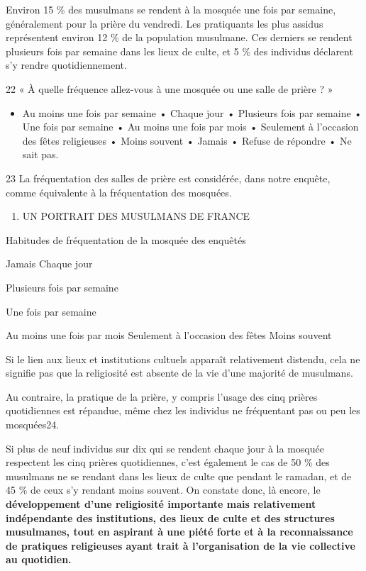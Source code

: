 Environ 15 \% des musulmans se rendent à la mosquée une fois par
semaine, généralement pour la prière du vendredi. Les pratiquants les
plus assidus représentent environ 12 \% de la population musulmane. Ces
derniers se rendent plusieurs fois par semaine dans les lieux de culte,
et 5 \% des individus déclarent s'y rendre quotidiennement.

22 « À quelle fréquence allez-vous à une mosquée ou une salle de prière
? »


\begin{itemize}
\item
  Au moins une fois par semaine • Chaque jour • Plusieurs fois par
  semaine • Une fois par semaine • Au moins une fois par mois •
  Seulement à l'occasion des fêtes religieuses • Moins souvent • Jamais
  • Refuse de répondre • Ne sait pas.
\end{itemize}


23 La fréquentation des salles de prière est considérée, dans notre
enquête, comme équivalente à la fréquentation des mosquées.


\begin{enumerate}
\def\labelenumi{\Roman{enumi}.}
\item
  UN PORTRAIT DES MUSULMANS DE FRANCE
\end{enumerate}

Habitudes de fréquentation de la mosquée des enquêtés


Jamais Chaque jour

Plusieurs fois par semaine

Une fois par semaine

Au moins une fois par mois Seulement à l'occasion des fêtes Moins
souvent

Si le lien aux lieux et institutions cultuels apparaît relativement
distendu, cela ne signifie pas que la religiosité est absente de la vie
d'une majorité de musulmans.

Au contraire, la pratique de la prière, y compris l'usage des cinq
prières quotidiennes est répandue, même chez les individus ne
fréquentant pas ou peu les mosquées24.

Si plus de neuf individus sur dix qui se rendent chaque jour à la
mosquée respectent les cinq prières quotidiennes, c'est également le cas
de 50 \% des musulmans ne se rendant dans les lieux de culte que pendant
le ramadan, et de 45 \% de ceux s'y rendant moins souvent. On constate
donc, là encore, le \textbf{développement d'une religiosité importante
mais relativement indépendante des institutions, des lieux de culte et
des structures musulmanes, tout en aspirant à une piété forte et à la
reconnaissance de pratiques religieuses ayant trait à l'organisation de
la vie collective au quotidien.}

